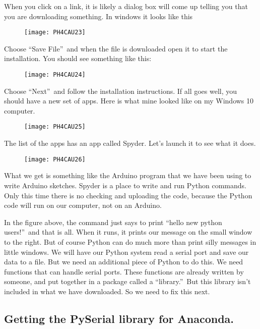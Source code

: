When you click on a link, it is likely a dialog box will come up telling you
that you are downloading something. In windows it looks like this 
\begin{figure}[h!]
\texttt{[image: PH4CAU23]}
\end{figure}

Choose \textquotedblleft Save File\textquotedblright\ and when the file is
downloaded open it to start the installation. You should see something like
this: 
\begin{figure}[h!]
\texttt{[image: PH4CAU24]}
\end{figure}

Choose \textquotedblleft Next\textquotedblright\ and follow the installation
instructions. If all goes well, you should have a new set of apps. Here is
what mine looked like on my Windows 10 computer. 
\begin{figure}[h!]
\texttt{[image: PH4CAU25]}
\end{figure}

The list of the apps has an app called Spyder. Let's launch it to see what
it does.
\begin{figure}[h!]
\texttt{[image: PH4CAU26]}
\end{figure}

What we get is something like the Arduino program that we have been using to
write Arduino sketches. Spyder is a place to write and run Python commands.
Only this time there is no checking and uploading the code, because the
Python code will run on our computer, not on an Arduino.

In the figure above, the command just says to print \textquotedblleft hello
new python users!\textquotedblright\ and that is all. When it runs, it
prints our message on the small window to the right. But of course Python
can do much more than print silly messages in little windows. We will have
our Python system read a serial port and save our data to a file. But we
need an additional piece of Python to do this. We need functions that can
handle serial ports. These functions are already written by someone, and put
together in a package called a \textquotedblleft library.\textquotedblright\
But this library isn't included in what we have downloaded. So we need to
fix this next.

\subsection{Getting the PySerial library for Anaconda.}

